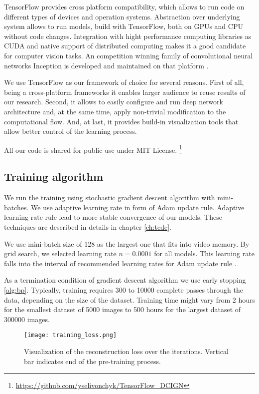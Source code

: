 TensorFlow provides cross platform compatibility, which allows to run code on different types of devices and operation systems.
Abstraction over underlying system allows to run models, build with TensorFlow, both on GPUs and CPU without code changes.
Integration with hight performance computing libraries as CUDA \cite{Nickolls2008} and native support of distributed computing makes it a good candidate for computer vision tasks.
An competition winning family of convolutional neural networks Inception is developed and maintained on that platform \cite{Szegedy2016}.

We use TensorFlow as our framework of choice for several reasons.
First of all, being a cross-platform frameworks it enables larger audience to reuse results of our research.
Second, it allows to easily configure and run deep network architecture and, at the same time, apply non-trivial modification to the computational flow.
And, at last, it provides build-in visualization tools that allow better control of the learning process.

All our code is shared for public use under MIT License.
\footnote{\url{https://github.com/yselivonchyk/TensorFlow_DCIGN}}

\subsection{Training algorithm}

We run the training using stochastic gradient descent algorithm with mini-batches.
We use adaptive learning rate in form of Adam update rule.
Adaptive learning rate rule lead to more stable convergence of our models.
These techniques are described in details in chapter \ref{ch:tede}.

We use mini-batch size of 128 as the largest one that fits into video memory.
By grid search, we selected learning rate $n=0.0001$ for all models. This learning rate falls into the interval of recommended learning rates for Adam update rule \cite{Kingma2015}.

As a termination condition of gradient descent algorithm we use early stopping \ref{alg:bp}. Typically, training requires 300 to 10000 complete passes through the data, depending on the size of the dataset. Training time might vary from 2 hours for the smallest dataset of 5000 images to 500 hours for the largest dataset of 300000 images.

\begin{figure}[h!]
  \centering
    \texttt{[image: training\_loss.png]}
  \caption{Visualization of the reconstruction loss over the iterations. Vertical bar indicates end of the pre-training process.}
  \label{fig:tf_graph}
\end{figure}


